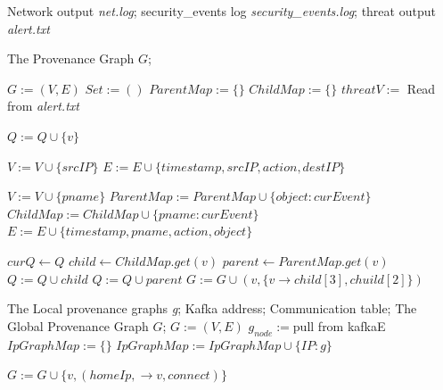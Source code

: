 \begin{algorithm}
	\caption{The Provenance Graph Creation}
	\label{The Provenance Graph Creation Label}
	\begin{algorithmic}[1]
		\Require
		Network output \textit{net.log}; 
		security\_events log \textit{security\_events.log}; 
		threat output \textit{alert.txt}
		
		\Ensure
		The Provenance Graph $G$;
		
		\State $G := (V,E)$
		\State $Set := ()$
		\State $ParentMap := \{ \}$
		\State $ChildMap := \{ \}$
		\State $threatV := $ Read from \textit{alert.txt}
		
		\State $Q := Q \cup \{v\}$
		\EndFor
		
		\State $V := V \cup \{srcIP\}$
		\State $E := E \cup \{timestamp,srcIP,action,destIP\} $
		\EndFor
		
		\State $V := V \cup \{pname\}$
		\State $ParentMap := ParentMap \cup \{object: curEvent\}$
		\State $ChildMap := ChildMap \cup \{pname: curEvent\}$
		\State $E := E \cup \{timestamp, pname, action, object\} $ \label{line3}
		\EndFor
		
		\State $curQ \leftarrow Q$
		\State $child \leftarrow ChildMap.get(v)$
		\State $parent \leftarrow ParentMap.get(v)$
		\State $Q := Q \cup child$
		\EndIf
		\State $Q := Q \cup parent$
		\EndIf
		\State $G := G \cup (v, \{v \rightarrow child[3], chuild[2]\})$ \label{line}
		\EndFor
		\EndWhile
		
	\end{algorithmic}

\end{algorithm}


\begin{algorithm}
	\caption{The Global Provenance Graph Creation}
	\label{The Global Provenance Graph Creation Label}
	\begin{algorithmic}[2]
		\Require
		The Local provenance graphs \textit{g}; Kafka address; Communication table;
		\Ensure
		The Global Provenance Graph $G$;
		\State $G := (V,E)$
		\State $g_{node} := $pull from kafkaE
		\State $IpGraphMap := \{\}$ 
		\State  $IpGraphMap := IpGraphMap \cup \{IP: \textit{g}\}$ 
		\EndWhile \label{line}
		
		\State $G := G \cup \{v, (homeIp, \rightarrow v, connect)\}$ 
		\EndFor \label{line}
		
	\end{algorithmic}
\end{algorithm}




